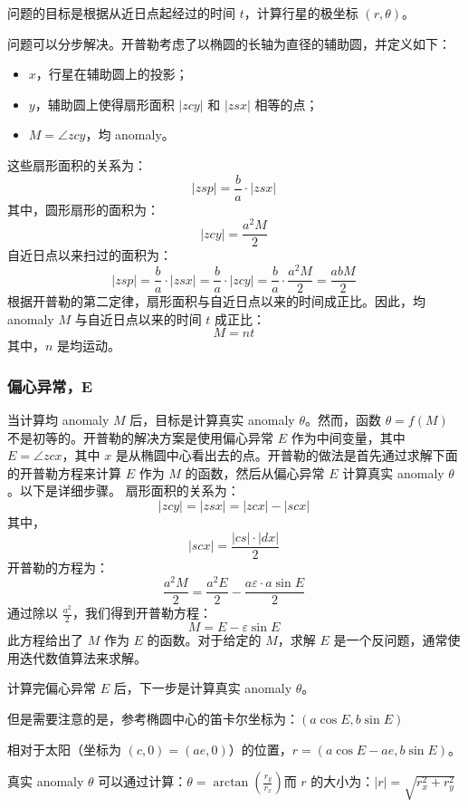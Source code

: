问题的目标是根据从近日点起经过的时间 \( t \)，计算行星的极坐标 \( (r, \theta) \)。

问题可以分步解决。开普勒考虑了以椭圆的长轴为直径的辅助圆，并定义如下：
\begin{itemize}
\item \(x\)，行星在辅助圆上的投影；
\item \(y\)，辅助圆上使得扇形面积 \(|zcy|\) 和 \(|zsx|\) 相等的点；
\item \( M = \angle zcy \)，均 anomaly。
\end{itemize}
这些扇形面积的关系为：
\[
|zsp| = \frac{b}{a} \cdot |zsx|~
\]
其中，圆形扇形的面积为：
\[
|zcy| = \frac{a^2 M}{2}~
\]
自近日点以来扫过的面积为：
\[
|zsp| = \frac{b}{a} \cdot |zsx| = \frac{b}{a} \cdot |zcy| = \frac{b}{a} \cdot \frac{a^2 M}{2} = \frac{abM}{2}~
\]
根据开普勒的第二定律，扇形面积与自近日点以来的时间成正比。因此，均 anomaly \( M \) 与自近日点以来的时间 \( t \) 成正比：
\[
M = nt~
\]
其中，\( n \) 是均运动。
\subsubsection{偏心异常，E}

当计算均 anomaly \( M \) 后，目标是计算真实 anomaly \( \theta \)。然而，函数 \( \theta = f(M) \) 不是初等的。开普勒的解决方案是使用偏心异常 \( E \) 作为中间变量，其中 \( E = \angle zcx \)，其中 \( x \) 是从椭圆中心看出去的点。开普勒的做法是首先通过求解下面的开普勒方程来计算 \( E \) 作为 \( M \) 的函数，然后从偏心异常 \( E \) 计算真实 anomaly \( \theta \)。以下是详细步骤。
扇形面积的关系为：
\[
|zcy| = |zsx| = |zcx| - |scx|~
\]
其中，
\[
|scx| = \frac{|cs| \cdot |dx|}{2}~
\]
开普勒的方程为：
\[
\frac{a^2 M}{2} = \frac{a^2 E}{2} - \frac{a \varepsilon \cdot a \sin E}{2}~
\]
通过除以 \( \frac{a^2}{2} \)，我们得到开普勒方程：
\[
M = E - \varepsilon \sin E~
\]
此方程给出了 \( M \) 作为 \( E \) 的函数。对于给定的 \( M \)，求解 \( E \) 是一个反问题，通常使用迭代数值算法来求解。

计算完偏心异常 \( E \) 后，下一步是计算真实 anomaly \( \theta \)。

但是需要注意的是，参考椭圆中心的笛卡尔坐标为：\((a \cos E, b \sin E)\)

相对于太阳（坐标为 \( (c, 0) = (ae, 0) \)）的位置，\( r = (a \cos E - ae, b \sin E) \)。

真实 anomaly \( \theta \) 可以通过计算：\(\theta = \arctan \left( \frac{r_y}{r_x} \right)\)而 \( r \) 的大小为：\(|r| = \sqrt{r_x^2 + r_y^2}\)















 
 
